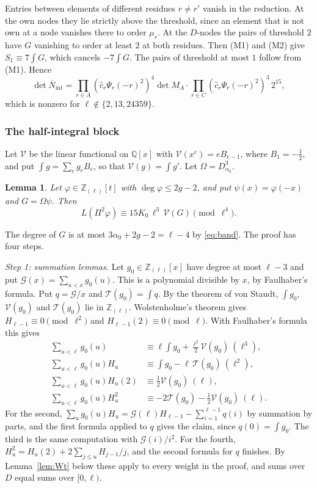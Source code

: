 \documentclass[11pt]{amsart}
\newtheorem{lemma}[theorem]{Lemma}
\theoremstyle{definition}
\theoremstyle{remark}
\numberwithin{equation}{section}
\newcommand{\Z}{\mathbb Z}
\newcommand{\Q}{\mathbb Q}
\begin{document}
Entries between elements of different residues $r\ne r'$ vanish in the reduction. At the own nodes they lie strictly above the threshold, since
an element that is not own at a node vanishes there to order $\mu_r$. At the $D$-nodes the pairs of threshold $2$ have
$G$ vanishing to order at least $2$ at both residues. Then (M1) and (M2) give $S_1\equiv7\int G$, which cancels $-7\int G$. The pairs of threshold at most $1$ follow from (M1).
Hence
\[
 \det\overline N_{\mathrm{int}}=\prod_{r\in A}(\hat c_r\Psi_r(-r)^2)^4\det M_A\cdot\prod_{r\in C}(\hat c_r\Psi_r(-r)^2)^3\,2^{15},
\]
which is nonzero for $\ell\notin\{2,13,24359\}$.

\subsubsection{The half-integral block}
Let $\mathcal V$ be the linear functional on $\Q[x]$ with $\mathcal V(x^e)=eB_{e-1}$, where $B_1=-\frac12$, and put $\int g=\sum_eg_eB_e$, so
that $\mathcal V(g)=\int g'$. Let $\Omega=D_{\alpha_0}^3$.

\begin{lemma}\label{lem:G3}
Let $\varphi\in\Z_{(\ell)}[t]$ with $\deg\varphi\le2g-2$, and put $\psi(x)=\varphi(-x)$ and $G=\Omega\psi$. Then
\[
 L(\Pi^2\varphi)\equiv15K_0\,\ell^3\,\mathcal V(G)\pmod{\ell^4}.
\]
\end{lemma}

The degree of $G$ is at most $3\alpha_0+2g-2=\ell-4$ by \eqref{eq:band}. The proof has four steps.

\emph{Step 1: summation lemmas.} Let $g_0\in\Z_{(\ell)}[x]$ have degree at most $\ell-3$ and put $\mathcal G(x)=\sum_{u<x}g_0(u)$. This is a
polynomial divisible by $x$, by Faulhaber's formula. Put $q=\mathcal G/x$ and $\mathcal T(g_0)=\int q$. By the theorem of von Staudt, $\int g_0$, $\mathcal V(g_0)$ and $\mathcal T(g_0)$ lie in $\Z_{(\ell)}$.
Wolstenholme's theorem gives $H_{\ell-1}\equiv0\pmod{\ell^2}$ and $H_{\ell-1}(2)\equiv0\pmod\ell$. With Faulhaber's formula this gives
\begin{align*}
 \sum_{u<\ell}g_0(u)&\equiv\ell\!\int g_0+\tfrac{\ell^2}2\mathcal V(g_0)\ (\ell^3),\\
 \sum_{u<\ell}g_0(u)H_u&\equiv\int g_0-\ell\,\mathcal T(g_0)\ (\ell^2),\\
 \sum_{u<\ell}g_0(u)H_u(2)&\equiv\tfrac12\mathcal V(g_0)\ (\ell),\\
 \sum_{u<\ell}g_0(u)H_u^2&\equiv-2\mathcal T(g_0)-\tfrac12\mathcal V(g_0)\ (\ell).
\end{align*}
For the second, $\sum_ug_0(u)H_u=\mathcal G(\ell)H_{\ell-1}-\sum_{i=1}^{\ell-1}q(i)$ by summation by parts, and the first formula applied to $q$ gives the claim, since $q(0)=\int g_0$. The third is the same computation
with $\mathcal G(i)/i^2$. For the fourth, $H_u^2=H_u(2)+2\sum_{j\le u}H_{j-1}/j$, and the second formula for $q$ finishes. By Lemma~\ref{lem:Wt} below these apply to every
weight in the proof, and sums over $D$ equal sums over $[0,\ell)$.
\end{document}
